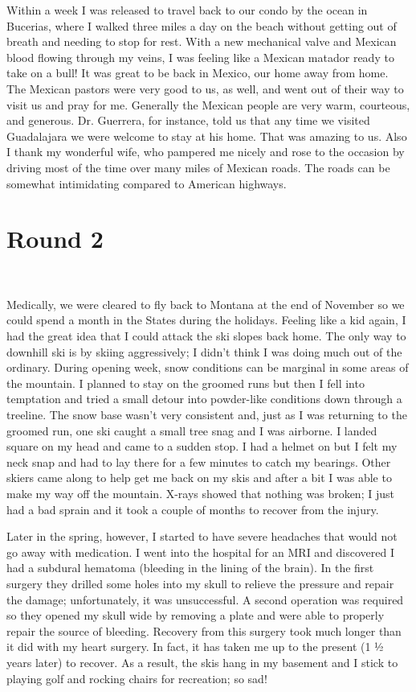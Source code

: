 \documentclass[oneside]{book}
\begin{document}
Within a week I was released to travel back to our condo by the ocean in Bucerias, where I walked three miles a day on the beach without getting out of breath and needing to stop for rest. With a new mechanical valve and Mexican blood flowing through my veins, I was feeling like a Mexican matador ready to take on a bull! It was great to be back in Mexico, our home away from home. The Mexican pastors were very good to us, as well, and went out of their way to visit us and pray for me. Generally the Mexican people are very warm, courteous, and generous. Dr. Guerrera, for instance, told us that any time we visited Guadalajara we were welcome to stay at his home. That was amazing to us. Also I thank my wonderful wife, who pampered me nicely and rose to the occasion by driving most of the time over many miles of Mexican roads. The roads can be somewhat intimidating compared to American highways. 


\section{Round 2}
\

Medically, we were cleared to fly back to Montana at the end of November so we could spend a month in the States during the holidays. Feeling like a kid again, I had the great idea that I could attack the ski slopes back home. The only way to downhill ski is by skiing aggressively; I didn't think I was doing much out of the ordinary. During opening week, snow conditions can be marginal in some areas of the mountain. I planned to stay on the groomed runs but then I fell into temptation and tried a small detour into powder-like conditions down through a treeline. The snow base wasn't very consistent and, just as I was returning to the groomed run, one ski caught a small tree snag and I was airborne. I landed square on my head and came to a sudden stop. I had a helmet on but I felt my neck snap and had to lay there for a few minutes to catch my bearings. Other skiers came along to help get me back on my skis and after a bit I was able to make my way off the mountain. X-rays showed that nothing was broken; I just had a bad sprain and it took a couple of months to recover from the injury. 

Later in the spring, however, I started to have severe headaches that would not go away with medication. I went into the hospital for an MRI and discovered I had a subdural hematoma (bleeding in the lining of the brain). In the first surgery they drilled some holes into my skull to relieve the pressure and repair the damage; unfortunately, it was unsuccessful. A second operation was required so they opened my skull wide by removing a plate and were able to properly repair the source of bleeding. Recovery from this surgery took much longer than it did with my heart surgery. In fact, it has taken me up to the present (1 ½ years later) to recover. As a result, the skis hang in my basement and I stick to playing golf and rocking chairs for recreation; so sad!
\end{document}
